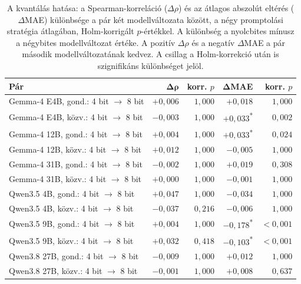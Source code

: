 \documentclass[
]{elteikthesis}[2024/04/26]
\begin{document}
\begin{table}[htbp]
	\centering
	\small
	\setlength{\tabcolsep}{4pt}
	\begin{tabular}{ | l | r | r | r | r | }
		\hline
		\textbf{Pár} &
		$\boldsymbol{\Delta\rho}$ &
		\textbf{korr. $p$} &
		$\boldsymbol{\Delta}$\textbf{MAE} &
		\textbf{korr. $p$} \\
		\hline \hline
		Gemma-4 E4B, gond.: 4 bit $\rightarrow$ 8 bit & $+0{,}006$ & $1{,}000$ & $+0{,}018$ & $1{,}000$ \\
		\hline
		Gemma-4 E4B, közv.: 4 bit $\rightarrow$ 8 bit & $-0{,}003$ & $1{,}000$ & $+0{,}033$\textsuperscript{*} & $0{,}002$ \\
		\hline
		Gemma-4 12B, gond.: 4 bit $\rightarrow$ 8 bit & $+0{,}004$ & $1{,}000$ & $+0{,}033$\textsuperscript{*} & $0{,}024$ \\
		\hline
		Gemma-4 12B, közv.: 4 bit $\rightarrow$ 8 bit & $+0{,}012$ & $1{,}000$ & $-0{,}005$ & $1{,}000$ \\
		\hline
		Gemma-4 31B, gond.: 4 bit $\rightarrow$ 8 bit & $-0{,}002$ & $1{,}000$ & $+0{,}019$ & $0{,}308$ \\
		\hline
		Gemma-4 31B, közv.: 4 bit $\rightarrow$ 8 bit & $+0{,}000$ & $1{,}000$ & $-0{,}001$ & $1{,}000$ \\
		\hline
		Qwen3.5 4B, gond.: 4 bit $\rightarrow$ 8 bit & $+0{,}047$ & $1{,}000$ & $-0{,}034$ & $1{,}000$ \\
		\hline
		Qwen3.5 4B, közv.: 4 bit $\rightarrow$ 8 bit & $-0{,}037$ & $0{,}216$ & $-0{,}006$ & $1{,}000$ \\
		\hline
		Qwen3.5 9B, gond.: 4 bit $\rightarrow$ 8 bit & $+0{,}004$ & $1{,}000$ & $-0{,}178$\textsuperscript{*} & $<0{,}001$ \\
		\hline
		Qwen3.5 9B, közv.: 4 bit $\rightarrow$ 8 bit & $+0{,}032$ & $0{,}418$ & $-0{,}103$\textsuperscript{*} & $<0{,}001$ \\
		\hline
		Qwen3.8 27B, gond.: 4 bit $\rightarrow$ 8 bit & $-0{,}009$ & $1{,}000$ & $+0{,}012$ & $1{,}000$ \\
		\hline
		Qwen3.8 27B, közv.: 4 bit $\rightarrow$ 8 bit & $-0{,}001$ & $1{,}000$ & $+0{,}008$ & $0{,}637$ \\
		\hline
	\end{tabular}
	\caption[A kvantálás hatása]{A kvantálás hatása: a Spearman-korreláció ($\Delta\rho$) és az átlagos abszolút eltérés ($\Delta$MAE)
	különbsége a pár két modellváltozata között, a négy promptolási stratégia átlagában, Holm-korrigált
	$p$-értékkel. A különbség a nyolcbites mínusz a négybites modellváltozat értéke. A pozitív $\Delta\rho$
	és a negatív $\Delta$MAE a pár második modellváltozatának kedvez. A csillag a Holm-korrekció után is
	szignifikáns különbséget jelöl.}
	\label{tab:app:axis:quantization}
\end{table}
\end{document}
